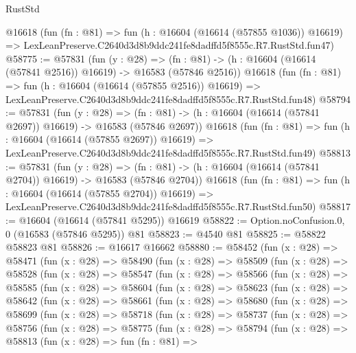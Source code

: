 \begin{lexlean}{RustStd}
\begin{coremodule}
    @16618
    (fun (fn : @81) =>
    fun (h : @16604 (@16614 (@57855 @1036)) @16619) =>
    LexLeanPreserve.C2640d3d8b9ddc241fe8dadffd5f8555c.R7.RustStd.fun47)
@58775 := @57831
    (fun (y : @28) =>
    (fn : @81) -> (h : @16604 (@16614 (@57841 @2516)) @16619) -> @16583 (@57846 @2516))
    @16618
    (fun (fn : @81) =>
    fun (h : @16604 (@16614 (@57855 @2516)) @16619) =>
    LexLeanPreserve.C2640d3d8b9ddc241fe8dadffd5f8555c.R7.RustStd.fun48)
@58794 := @57831
    (fun (y : @28) =>
    (fn : @81) -> (h : @16604 (@16614 (@57841 @2697)) @16619) -> @16583 (@57846 @2697))
    @16618
    (fun (fn : @81) =>
    fun (h : @16604 (@16614 (@57855 @2697)) @16619) =>
    LexLeanPreserve.C2640d3d8b9ddc241fe8dadffd5f8555c.R7.RustStd.fun49)
@58813 := @57831
    (fun (y : @28) =>
    (fn : @81) -> (h : @16604 (@16614 (@57841 @2704)) @16619) -> @16583 (@57846 @2704))
    @16618
    (fun (fn : @81) =>
    fun (h : @16604 (@16614 (@57855 @2704)) @16619) =>
    LexLeanPreserve.C2640d3d8b9ddc241fe8dadffd5f8555c.R7.RustStd.fun50)
@58817 := @16604 (@16614 (@57841 @5295)) @16619
@58822 := Option.noConfusion.{0, 0} (@16583 (@57846 @5295)) @81
@58823 := @4540 @81
@58825 := @58822 @58823 @81
@58826 := @16617 @16662
@58880 := @58452
    (fun (x : @28) =>
    @58471
      (fun (x : @28) =>
      @58490
        (fun (x : @28) =>
        @58509
          (fun (x : @28) =>
          @58528
            (fun (x : @28) =>
            @58547
              (fun (x : @28) =>
              @58566
                (fun (x : @28) =>
                @58585
                  (fun (x : @28) =>
                  @58604
                    (fun (x : @28) =>
                    @58623
                      (fun (x : @28) =>
                      @58642
                        (fun (x : @28) =>
                        @58661
                          (fun (x : @28) =>
                          @58680
                            (fun (x : @28) =>
                            @58699
                              (fun (x : @28) =>
                              @58718
                                (fun (x : @28) =>
                                @58737
                                  (fun (x : @28) =>
                                  @58756
                                    (fun (x : @28) =>
                                    @58775
                                      (fun (x : @28) =>
                                      @58794
                                        (fun (x : @28) =>
                                        @58813
                                          (fun (x : @28) =>
                                          fun (fn : @81) =>

\end{coremodule}
\end{lexlean}
